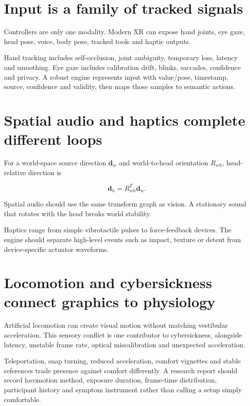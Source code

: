 \section{Input is a family of tracked signals}\label{04-visual-computing-ii-ch035-input-is-a-family-of-tracked-signals}

Controllers are only one modality. Modern XR can expose hand joints, eye gaze, head pose, voice, body pose, tracked tools and haptic outputs.

Hand tracking includes self-occlusion, joint ambiguity, temporary loss, latency and smoothing. Eye gaze includes calibration drift, blinks, saccades, confidence and privacy. A robust engine represents input with value/pose, timestamp, source, confidence and validity, then maps those samples to semantic actions.

\section{Spatial audio and haptics complete different loops}\label{04-visual-computing-ii-ch035-spatial-audio-and-haptics-complete-different-loops}

For a world-space source direction \(\mathbf d_w\) and world-to-head orientation \(R_{wh}\), head-relative direction is

\[
\mathbf d_h=R_{wh}^{T}\mathbf d_w.
\]

Spatial audio should use the same transform graph as vision. A stationary sound that rotates with the head breaks world stability.

Haptics range from simple vibrotactile pulses to force-feedback devices. The engine should separate high-level events such as impact, texture or detent from device-specific actuator waveforms.

\section{Locomotion and cybersickness connect graphics to physiology}\label{04-visual-computing-ii-ch035-locomotion-and-cybersickness-connect-graphics-to-physiology}

Artificial locomotion can create visual motion without matching vestibular acceleration. This sensory conflict is one contributor to cybersickness, alongside latency, unstable frame rate, optical miscalibration and unexpected acceleration.

Teleportation, snap turning, reduced acceleration, comfort vignettes and stable references trade presence against comfort differently. A research report should record locomotion method, exposure duration, frame-time distribution, participant history and symptom instrument rather than calling a setup simply comfortable.

